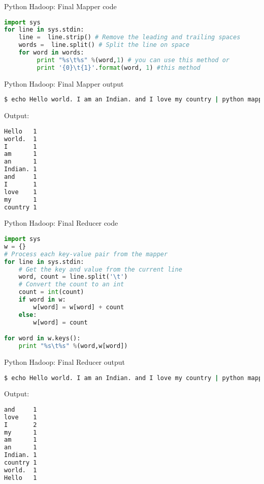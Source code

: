 \documentclass[pdf]{beamer}
\begin{document}
\begin{frame}[fragile]{Python Hadoop: Final Mapper code}
\begin{lstlisting}[language=python]
import sys
for line in sys.stdin:
    line =  line.strip() # Remove the leading and trailing spaces
    words =  line.split() # Split the line on space
    for word in words:
         print "%s\t%s" %(word,1) # you can use this method or
         print '{0}\t{1}'.format(word, 1) #this method
\end{lstlisting}
\end{frame}

\begin{frame}[fragile]{Python Hadoop: Final Mapper output}
\begin{lstlisting}[language=bash]
$ echo Hello world. I am an Indian. and I love my country | python mapper.py 
\end{lstlisting}
Output:
\begin{lstlisting}[language=bash]
Hello   1
world.  1
I       1
am      1
an      1
Indian. 1
and     1
I       1
love    1
my      1
country 1
\end{lstlisting}
\end{frame}


\begin{frame}[fragile]{Python Hadoop: Final Reducer code}
\begin{lstlisting}[language=python]
import sys
w = {}
# Process each key-value pair from the mapper
for line in sys.stdin:
    # Get the key and value from the current line
    word, count = line.split('\t')
    # Convert the count to an int
    count = int(count)
    if word in w:
        w[word] = w[word] + count
    else:
        w[word] = count

for word in w.keys():
    print "%s\t%s" %(word,w[word])
\end{lstlisting}
\end{frame}



\begin{frame}[fragile]{Python Hadoop: Final Reducer output}
\begin{lstlisting}[language=bash]
$ echo Hello world. I am an Indian. and I love my country | python mapper.py | python reducer.py
\end{lstlisting}
Output:
\begin{lstlisting}[language=bash]
and     1
love    1
I       2
my      1
am      1
an      1
Indian. 1
country 1
world.  1
Hello   1
\end{lstlisting}
\end{frame}
\end{document}
